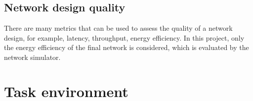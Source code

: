 \documentclass[12pt]{article}
\theoremstyle{definition}
\begin{document}
\subsection{Network design quality}
There are many metrics that can be used to assess the quality of a network design, for example, latency, throughput, energy efficiency. In this project, only the energy efficiency of the final network is considered, which is evaluated by the network simulator.



\section{Task environment}
\end{document}
